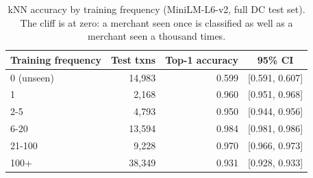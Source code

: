 \begin{table}[t]
\centering
\caption{kNN accuracy by training frequency (MiniLM-L6-v2, full DC test set). The cliff is at zero: a merchant seen once is classified as well as a merchant seen a thousand times.}
\label{tab:accfreq}
\begin{tabular}{lrrc}
\toprule
Training frequency & Test txns & Top-1 accuracy & 95\% CI\\
\midrule
0 (unseen) & 14,983 & 0.599 & [0.591, 0.607] \\
1 & 2,168 & 0.960 & [0.951, 0.968] \\
2-5 & 4,793 & 0.950 & [0.944, 0.956] \\
6-20 & 13,594 & 0.984 & [0.981, 0.986] \\
21-100 & 9,228 & 0.970 & [0.966, 0.973] \\
100+ & 38,349 & 0.931 & [0.928, 0.933] \\
\bottomrule
\end{tabular}
\end{table}
